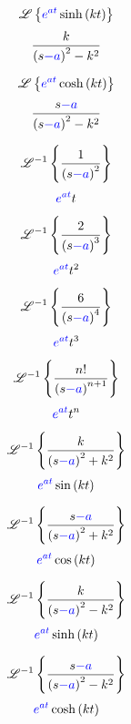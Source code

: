 \documentclass[grid, poker_landscape]{flashcards}
\newcommand{\Lap}{\ensuremath{\mathscr{L}}}
\newcommand{\invLap}{\ensuremath{\mathscr{L}^{-1}}}
\begin{document}
  \begin{flashcard}{ \[ \Lap\left\{ 
      {\color{blue}e^{at}} \sinh \left( kt \right)
    \right\} \] }
    \[
      \frac{k}{\left( s {\color{blue}-a} \right)^{2} - k^{2}}
    \]
  \end{flashcard}

  \begin{flashcard}{ \[ \Lap\left\{
      {\color{blue}e^{at}} \cosh \left( kt \right)
    \right\} \] }
    \[
      \frac{s{\color{blue}-a}}{\left( s {\color{blue}-a} \right)^{2} - k^{2}}
    \]
  \end{flashcard}
  
  \begin{flashcard}{ \[ \invLap\left\{
      \frac{1}{\left(s{\color{blue}-a}\right)^{2}}
    \right\} \] }
    \[
      {\color{blue}e^{at}}t
    \]
  \end{flashcard}

  \begin{flashcard}{ \[ \invLap\left\{
      \frac{2}{\left(s{\color{blue}-a}\right)^{3}}
    \right\} \] }
    \[
      {\color{blue}e^{at}}t^{2}
    \]
  \end{flashcard}

  \begin{flashcard}{ \[ \invLap\left\{
      \frac{6}{\left(s{\color{blue}-a}\right)^{4}}
    \right\} \] }
    \[
      {\color{blue}e^{at}}t^{3}
    \]
  \end{flashcard}

  \begin{flashcard}{ \[ \invLap\left\{
      \frac{n!}{\left(s{\color{blue}-a}\right)^{n+1}}
    \right\} \] }
    \[
      {\color{blue}e^{at}}t^{n}
    \]
  \end{flashcard}

  \begin{flashcard}{ \[ \invLap\left\{
      \frac{k}{\left(s{\color{blue}-a}\right)^{2}+k^{2}}
    \right\} \] }
    \[
      {\color{blue}e^{at}}\sin\left(kt\right)
    \]
  \end{flashcard}

  \begin{flashcard}{ \[ \invLap\left\{
      \frac{s{\color{blue}-a}}{\left(s{\color{blue}-a}\right)^{2}+k^{2}}
    \right\} \] }
    \[
      {\color{blue}e^{at}}\cos\left(kt\right)
    \]
  \end{flashcard}

  \begin{flashcard}{ \[ \invLap\left\{
    \frac{k}{\left(s{\color{blue}-a}\right)^{2}-k^{2}}
    \right\} \] }
    \[
      {\color{blue}e^{at}}\sinh\left(kt\right)
    \]
  \end{flashcard}

  \begin{flashcard}{ \[ \invLap\left\{
    \frac{s{\color{blue}-a}}{\left(s{\color{blue}-a}\right)^{2}-k^{2}}
    \right\} \] }
    \[
      {\color{blue}e^{at}}\cosh\left(kt\right)
    \]
  \end{flashcard}
\end{document}
